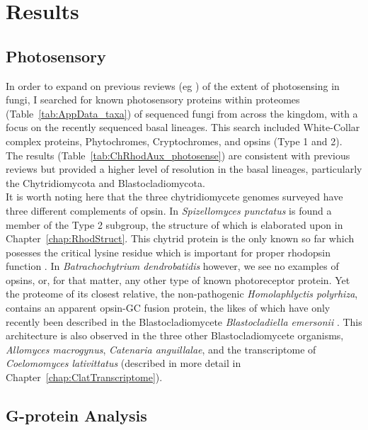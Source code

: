 \section{Results}
\subsection{Photosensory}
In order to expand on previous reviews (eg \cite{Idnurm2010}) of the extent of photosensing in fungi, I searched for known photosensory proteins within proteomes (Table~\ref{tab:AppData_taxa}) of sequenced fungi from across the kingdom, with a focus on the recently sequenced basal lineages. This search included White-Collar complex proteins, Phytochromes, Cryptochromes, and opsins (Type 1 and 2). The results (Table~\ref{tab:ChRhodAux_photosense}) are consistent with previous reviews but provided a higher level of resolution in the basal lineages, particularly the Chytridiomycota and Blastocladiomycota.\\
\indent It is worth noting here that the three chytridiomycete genomes surveyed have three different complements of opsin. In \textit{Spizellomyces punctatus} is found a member of the Type 2 subgroup, the structure of which is elaborated upon in Chapter~\ref{chap:RhodStruct}. This chytrid protein is the only known so far which posesses the critical lysine residue which is important for proper rhodopsin function \cite{}. In \textit{Batrachochytrium dendrobatidis} however, we see no examples of opsins, or, for that matter, any other type of known photoreceptor protein. Yet the proteome of its closest relative, the non-pathogenic \textit{Homolaphlyctis polyrhiza}, contains an apparent opsin-GC fusion protein, the likes of which have only recently been described in the Blastocladiomycete \textit{Blastocladiella emersonii} \cite{Avelar2014}. This architecture is also observed in the three other Blastocladiomycete organisms, \textit{Allomyces macrogynus}, \textit{Catenaria anguillalae}, and the transcriptome of \textit{Coelomomyces lativittatus} (described in more detail in Chapter~\ref{chap:ClatTranscriptome}).\\

\subsection{G-protein Analysis}
